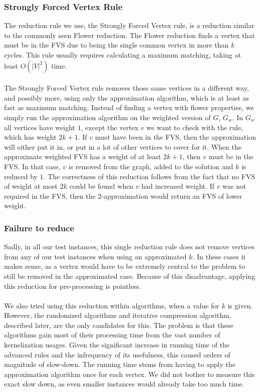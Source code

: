 \subsubsection{Strongly Forced Vertex Rule}
The reduction rule we use, the Strongly Forced Vertex rule, is a reduction similar to the commonly seen Flower reduction. The Flower reduction finds a vertex that must be in the FVS due to being the single common vertex in more than $k$ cycles. This rule usually requires calculating a maximum matching, taking at least $O(|V|^2)$ time. \\\\
The Strongly Forced Vertex rule removes those same vertices in a different way, and possibly more, using only the approximation algorithm, which is at least as fast as maximum matching. Instead of finding a vertex with flower properties, we simply run the approximation algorithm on the weighted version of $G$, $G_w$. In $G_w$ all vertices have weight $1$, except the vertex $v$ we want to check with the rule, which has weight $2k+1$. If $v$ must have been in the FVS, then the approximation will either put it in, or put in a lot of other vertices to cover for it. When the approximate weighted FVS has a weight of at least $2k+1$, then $v$ must be in the FVS. In that case, $v$ is removed from the graph, added to the solution and $k$ is reduced by $1$. The correctness of this reduction follows from the fact that no FVS of weight at most $2k$ could be found when $v$ had increased weight. If $v$ was not required in the FVS, then the 2-approximation would return an FVS of lower weight.
\subsubsection{Failure to reduce}
Sadly, in all our test instances, this single reduction rule does not remove vertices from any of our test instances when using an approximated $k$. In these cases it makes sense, as a vertex would have to be extremely central to the problem to still be removed in the approximated case. Because of this disadvantage, applying this reduction for pre-processing is pointless. \\\\
We also tried using this reduction within algorithms, when a value for $k$ is given. However, the randomized algorithms and iterative compression algorithm, described later, are the only candidates for this. The problem is that these algorithms gain most of their processing time from the vast number of kernelization usages. Given the significant increase in running time of the advanced rules and the infrequency of its usefulness, this caused orders of magnitude of slow-down. The running time stems from having to apply the approximation algorithm once for each vertex. We did not bother to measure this exact slow down, as even smaller instances would already take too much time.
